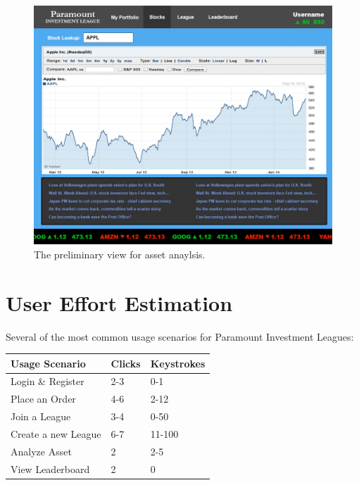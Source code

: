 \begin{figure}
\centering
\includegraphics[width=5.5in]{./img/mock/stocks.jpg}
\caption{The preliminary view for asset anaylsis.}
\end{figure}


\section{User Effort Estimation}

Several of the most common usage scenarios for Paramount Investment Leagues:\\

\begin{center}
\begin{tabular}{| l | l | l |}
\hline
\textbf{Usage Scenario} & \textbf{Clicks} & \textbf{Keystrokes} \\ \hline
Login \& Register & 2-3 & 0-1 \\ \hline
Place an Order & 4-6 & 2-12 \\ \hline
Join a League & 3-4 & 0-50 \\ \hline
Create a new League & 6-7 & 11-100 \\ \hline
Analyze Asset & 2 & 2-5 \\ \hline
View Leaderboard & 2 & 0 \\ \hline
\end{tabular}
\end{center}


